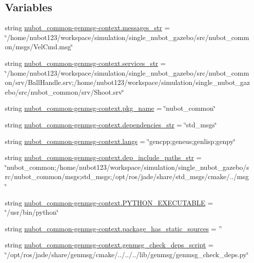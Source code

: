 \subsection*{Variables}
\begin{DoxyCompactItemize}
\item 
string \hyperlink{namespacenubot__common-genmsg-context_a9d82d20e4ffa677c598751d6630dc734}{nubot\-\_\-common-\/genmsg-\/context.\-messages\-\_\-str} = \char`\"{}/home/nubot123/workspace/simulation/single\-\_\-nubot\-\_\-gazebo/src/nubot\-\_\-common/msgs/Vel\-Cmd.\-msg\char`\"{}
\item 
string \hyperlink{namespacenubot__common-genmsg-context_a1e2a824c1778c805a4593863a72ba35e}{nubot\-\_\-common-\/genmsg-\/context.\-services\-\_\-str} = \char`\"{}/home/nubot123/workspace/simulation/single\-\_\-nubot\-\_\-gazebo/src/nubot\-\_\-common/srv/Ball\-Handle.\-srv;/home/nubot123/workspace/simulation/single\-\_\-nubot\-\_\-gazebo/src/nubot\-\_\-common/srv/Shoot.\-srv\char`\"{}
\item 
string \hyperlink{namespacenubot__common-genmsg-context_aa7e82af182943505146665259b8e1ce9}{nubot\-\_\-common-\/genmsg-\/context.\-pkg\-\_\-name} = \char`\"{}nubot\-\_\-common\char`\"{}
\item 
string \hyperlink{namespacenubot__common-genmsg-context_acb3057b57eb9458421378baa13f383d0}{nubot\-\_\-common-\/genmsg-\/context.\-dependencies\-\_\-str} = \char`\"{}std\-\_\-msgs\char`\"{}
\item 
string \hyperlink{namespacenubot__common-genmsg-context_ad47fe39b5ca574c609a0a44451d67ebe}{nubot\-\_\-common-\/genmsg-\/context.\-langs} = \char`\"{}gencpp;geneus;genlisp;genpy\char`\"{}
\item 
string \hyperlink{namespacenubot__common-genmsg-context_a3cb8468ce84e82ac5e2b66290f260f4c}{nubot\-\_\-common-\/genmsg-\/context.\-dep\-\_\-include\-\_\-paths\-\_\-str} = \char`\"{}nubot\-\_\-common;/home/nubot123/workspace/simulation/single\-\_\-nubot\-\_\-gazebo/src/nubot\-\_\-common/msgs;std\-\_\-msgs;/opt/ros/jade/share/std\-\_\-msgs/cmake/../msg\char`\"{}
\item 
string \hyperlink{namespacenubot__common-genmsg-context_a07f30a33447f3b83a20605f1732e2763}{nubot\-\_\-common-\/genmsg-\/context.\-P\-Y\-T\-H\-O\-N\-\_\-\-E\-X\-E\-C\-U\-T\-A\-B\-L\-E} = \char`\"{}/usr/bin/python\char`\"{}
\item 
string \hyperlink{namespacenubot__common-genmsg-context_a9b23bed4614ce829e09eb98736bbcfb6}{nubot\-\_\-common-\/genmsg-\/context.\-package\-\_\-has\-\_\-static\-\_\-sources} = ''
\item 
string \hyperlink{namespacenubot__common-genmsg-context_a32a0523eb31dd66d816b3d32bd6aa2b5}{nubot\-\_\-common-\/genmsg-\/context.\-genmsg\-\_\-check\-\_\-deps\-\_\-script} = \char`\"{}/opt/ros/jade/share/genmsg/cmake/../../../lib/genmsg/genmsg\-\_\-check\-\_\-deps.\-py\char`\"{}
\end{DoxyCompactItemize}
